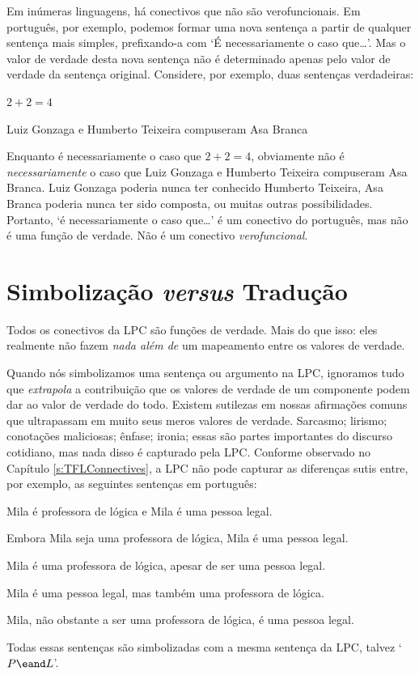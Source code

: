 Em inúmeras linguagens, há conectivos que não são verofuncionais.
Em português, por exemplo, podemos formar uma nova sentença a partir de qualquer sentença mais simples, prefixando-a com `É necessariamente o caso que\ldots'.
Mas o valor de verdade desta nova sentença não é determinado apenas pelo valor de verdade da sentença original.
Considere, por exemplo, duas sentenças verdadeiras:
	\begin{earg}
		\item $2 + 2 = 4$
		\item Luiz Gonzaga e Humberto Teixeira compuseram Asa Branca
	\end{earg}
Enquanto é necessariamente o caso que $2+2=4$, obviamente não é \emph{necessariamente} o caso que Luiz Gonzaga e Humberto Teixeira compuseram Asa Branca.
Luiz Gonzaga poderia nunca ter conhecido Humberto Teixeira, Asa Branca poderia nunca ter sido composta, ou muitas outras possibilidades.
Portanto, `é necessariamente o caso que\ldots' é um conectivo do português, mas não é uma função de verdade.
Não é um conectivo \emph{verofuncional}.



\section{Simbolização \emph{versus} Tradução}
Todos os conectivos da LPC são funções de verdade.
Mais do que isso:  eles realmente não fazem \emph{nada além de} um mapeamento entre os valores de verdade.  

Quando nós simbolizamos uma sentença ou argumento na LPC, ignoramos tudo que \emph{extrapola} a contribuição que os valores de verdade de um componente podem dar ao valor de verdade do todo.
Existem sutilezas em nossas afirmações comuns que ultrapassam em muito seus meros valores de verdade.
Sarcasmo; lirismo; conotações maliciosas; ênfase; ironia; essas são partes importantes do discurso cotidiano, mas nada disso é capturado pela LPC.
Conforme observado no Capítulo \ref{s:TFLConnectives},
a LPC não pode capturar as diferenças sutis entre, por exemplo, as seguintes sentenças em português:
	\begin{earg}
		\item Mila é professora de lógica e Mila é uma pessoa legal.
		\item Embora Mila seja uma professora de lógica, Mila é uma pessoa legal.
		\item Mila é uma professora de lógica, apesar de ser uma pessoa legal.
		\item Mila é uma pessoa legal, mas também uma professora de lógica.
		\item Mila, não obstante a ser uma professora de lógica, é uma pessoa legal.
	\end{earg}
Todas essas sentenças são simbolizadas com a mesma sentença da LPC, talvez `$P \eand L$'.

